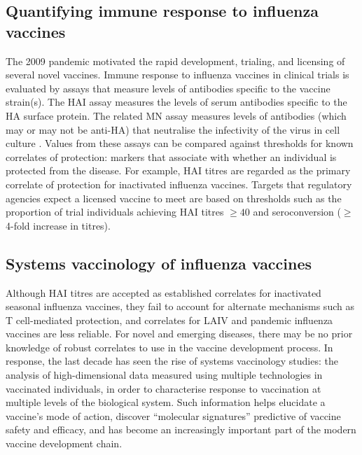 \subsection{Quantifying immune response to influenza vaccines}

The 2009 pandemic motivated the rapid development, trialing, and licensing of several novel vaccines\autocite{broadbent2011InfluenzaVirusVaccines}.
Immune response to influenza vaccines in clinical trials is evaluated by assays that measure levels of antibodies specific to the vaccine strain(s).
The \gls{HAI} assay measures the levels of serum antibodies specific to the \gls{HA} surface protein.
The related \gls{MN} assay measures levels of antibodies (which may or may not be anti-\gls{HA}) that neutralise the infectivity of the virus in cell culture \autocite{klimov2012InfluenzaVirusTitration}.
Values from these assays can be compared against thresholds for known correlates of protection: markers that associate with whether an individual is protected from the disease.
For example, \gls{HAI} titres are regarded as the primary correlate of protection for inactivated influenza vaccines.
Targets that regulatory agencies expect a licensed vaccine to meet are based on thresholds such as the proportion of trial individuals achieving \gls{HAI} titres $\ge 40$ and seroconversion ($\ge$ 4-fold increase in titres)\autocite{plotkin2010CorrelatesProtectionInduced,cox2013CorrelatesProtectionInfluenza}.

\subsection{Systems vaccinology of influenza vaccines}

Although \gls{HAI} titres are accepted as established correlates for inactivated seasonal influenza vaccines, they fail to account for alternate mechanisms such as T cell-mediated protection, and correlates for \gls{LAIV} and pandemic influenza vaccines are less reliable\autocite{houser2015InfluenzaVaccinesChallenges}.
For novel and emerging diseases, there may be no prior knowledge of robust correlates to use in the vaccine development process.
In response, the last decade has seen the rise of systems vaccinology studies: the analysis of high-dimensional data measured using multiple technologies in vaccinated individuals, in order to characterise response to vaccination at multiple levels of the biological system\autocite{pulendran2014SystemsVaccinologyProbing}.
Such information helps elucidate a vaccine's mode of action, discover \enquote{molecular signatures} predictive of vaccine safety and efficacy, and has become an increasingly important part of the modern vaccine development chain\autocite{hagan2015SystemsVaccinologyEnabling,raeven2019SystemsVaccinologyBig}.

